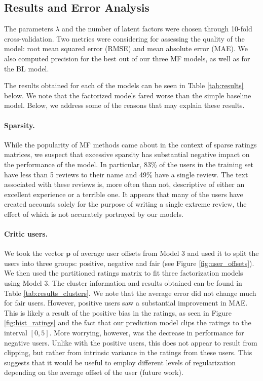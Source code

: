 \documentclass[12pt]{article}
\newcommand{\mbf}[1]{\mathbf{#1}}
\begin{document}
\subsection{Results and Error Analysis}\label{errors}
The parameters $\lambda$ and the number of latent factors were chosen through 10-fold cross-validation. Two metrics were considering for assessing the quality of the model: root mean squared error (RMSE) and mean absolute error (MAE). We also computed precision for the best out of our three MF models, as well as for the BL model.

The results obtained for each of the models can be seen in Table \ref{tab:results} below. We note that the factorized models fared worse than the simple baseline model. Below, we address some of the reasons that may explain these results.

\paragraph{Sparsity.} While the popularity of MF methods came about in the context of sparse ratings matrices, we suspect that excessive sparsity has substantial negative impact on the performance of the model. In particular, 83\% of the users in the training set have less than 5 reviews to their name and 49\% have a single review. The text associated with these reviews is, more often than not, descriptive of either an excellent experience or a terrible one. It appears that many of the users have created accounts solely for the purpose of writing a single extreme review, the effect of which is not accurately portrayed by our models.

\paragraph{Critic users.} We took the vector $\mbf p$ of average user offsets from Model 3 and used it to split the users into three groups: positive, negative and fair (see Figure \ref{fig:user_offsets}). We then used the partitioned ratings matrix to fit three factorization models using Model 3. The cluster information and results obtained can be found in Table \ref{tab:results_clusters}. We note that the average error did not change much for fair users. However, positive users saw a substantial improvement in MAE. This is likely a result of the positive bias in the ratings, as seen in Figure \ref{fig:hist_ratings} and the fact that our prediction model clips the ratings to the interval $[0,5]$. More worrying, however, was the decrease in performance for negative users. Unlike with the positive users, this does not appear to result from clipping, but rather from intrinsic variance in the ratings from these users. This suggests that it would be useful to employ different levels of regularization depending on the average offset of the user (future work).
\end{document}
